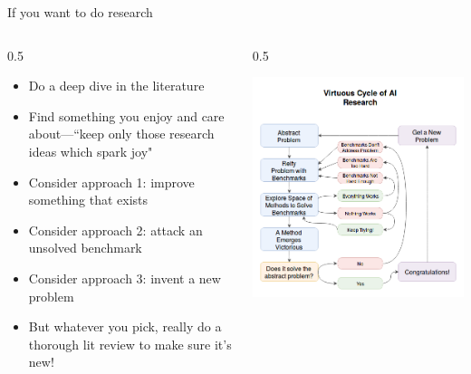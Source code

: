 \documentclass[9pt]{beamer}
\newcommand{\twocolumns}[4]{
\begin{columns}
\begin{column}{#1\textwidth}
    #3
\end{column}
\begin{column}{#2\textwidth}
	#4
\end{column}
\end{columns}
}
\begin{document}
\begin{frame}{If you want to do research}

\twocolumns{0.5}{0.5}{
\begin{itemize}
\item Do a deep dive in the literature
\item Find something you enjoy and care about---``keep only those research ideas which spark joy"
\item Consider approach 1: improve something that exists
\item Consider approach 2: attack an unsolved benchmark
\item Consider approach 3: invent a new problem
\item But whatever you pick, really do a thorough lit review to make sure it's new!
\end{itemize}
}{
\begin{center}
\includegraphics[width=\textwidth]{virtuous_cycle2}
\end{center}
}
\end{frame}
\end{document}
